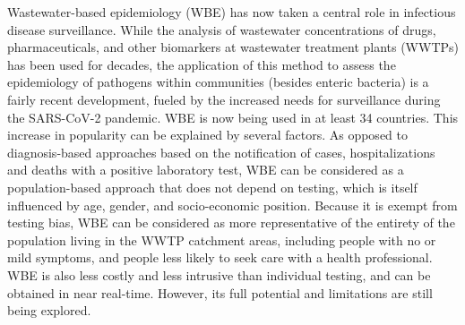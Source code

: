 \documentclass[10pt,letterpaper]{article}
\begin{document}
Wastewater-based epidemiology (WBE) has now taken a central role in infectious disease surveillance.
While the analysis of wastewater concentrations of drugs, pharmaceuticals, and other biomarkers at wastewater treatment plants (WWTPs) has been used for decades, the application of this method to assess the epidemiology of pathogens within communities (besides enteric bacteria) is a fairly recent development\cite{choiWastewaterbasedEpidemiologyBiomarkers2018a}, fueled by the increased needs for surveillance during the SARS-CoV-2 pandemic.
WBE is now being used in at least 34 countries\cite{shahWastewaterSurveillanceInfer2022}.
This increase in popularity can be explained by several factors. 
As opposed to diagnosis-based approaches based on the notification of cases, hospitalizations and deaths with a positive laboratory test, WBE can be considered as a population-based approach that does not depend on testing, which is itself influenced by age, gender, and socio-economic position\cite{scullySexGenderDifferences2021,stallSexAgeSpecificDifferences2020,riouSocioeconomicPositionCOVID192021}.
Because it is exempt from testing bias, WBE can be considered as more representative of the entirety of the population living in the WWTP catchment areas, including people with no or mild symptoms, and people less likely to seek care with a health professional. 
WBE is also less costly and less intrusive than individual testing, and can be obtained in near real-time.
However, its full potential and limitations are still being explored.
\end{document}
